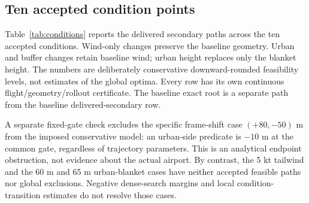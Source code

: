 \subsection{Ten accepted condition points}
Table~\ref{tab:conditions} reports the delivered secondary paths across the ten accepted conditions. Wind-only changes preserve the baseline geometry. Urban and buffer changes retain baseline wind; urban height replaces only the blanket height. The numbers are deliberately conservative downward-rounded feasibility levels, not estimates of the global optima. Every row has its own continuous flight/geometry/rollout certificate. The baseline exact root is a separate path from the baseline delivered-secondary row.


A separate fixed-gate check excludes the specific frame-shift case $(+80,-50)$ m from the imposed conservative model: an urban-side predicate is $-10$ m at the common gate, regardless of trajectory parameters. This is an analytical endpoint obstruction, not evidence about the actual airport. By contrast, the 5 kt tailwind and the 60 m and 65 m urban-blanket cases have neither accepted feasible paths nor global exclusions. Negative dense-search margins and local condition-transition estimates do not resolve those cases.
